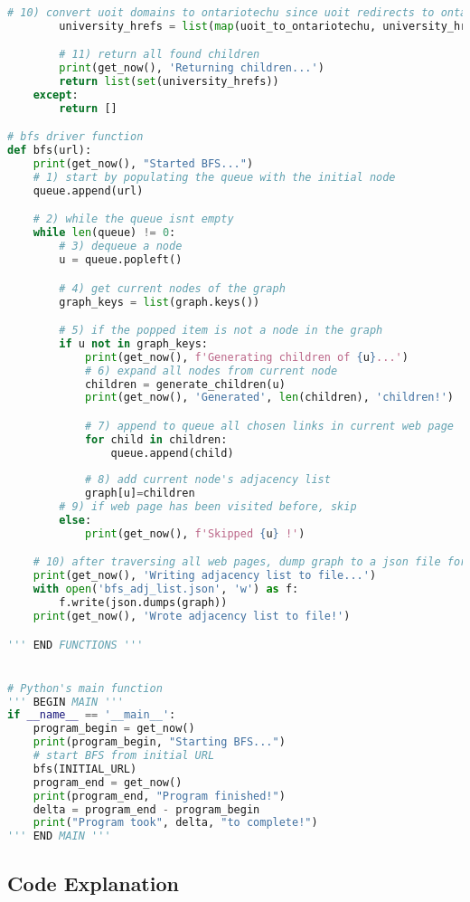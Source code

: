 \begin{lstlisting}[language=Python]
        # 10) convert uoit domains to ontariotechu since uoit redirects to ontariotech
        university_hrefs = list(map(uoit_to_ontariotechu, university_hrefs))

        # 11) return all found children
        print(get_now(), 'Returning children...')
        return list(set(university_hrefs))
    except:
        return []

# bfs driver function
def bfs(url):
    print(get_now(), "Started BFS...")
    # 1) start by populating the queue with the initial node
    queue.append(url)

    # 2) while the queue isnt empty
    while len(queue) != 0:
        # 3) dequeue a node
        u = queue.popleft()

        # 4) get current nodes of the graph
        graph_keys = list(graph.keys())

        # 5) if the popped item is not a node in the graph
        if u not in graph_keys:
            print(get_now(), f'Generating children of {u}...')
            # 6) expand all nodes from current node
            children = generate_children(u)
            print(get_now(), 'Generated', len(children), 'children!')

            # 7) append to queue all chosen links in current web page
            for child in children:
                queue.append(child)
            
            # 8) add current node's adjacency list
            graph[u]=children
        # 9) if web page has been visited before, skip
        else:
            print(get_now(), f'Skipped {u} !')

    # 10) after traversing all web pages, dump graph to a json file for posterior processing and analytics
    print(get_now(), 'Writing adjacency list to file...')
    with open('bfs_adj_list.json', 'w') as f:
        f.write(json.dumps(graph))
    print(get_now(), 'Wrote adjacency list to file!')

''' END FUNCTIONS '''


# Python's main function
''' BEGIN MAIN '''
if __name__ == '__main__':
    program_begin = get_now()
    print(program_begin, "Starting BFS...")
    # start BFS from initial URL
    bfs(INITIAL_URL)
    program_end = get_now()
    print(program_end, "Program finished!")
    delta = program_end - program_begin
    print("Program took", delta, "to complete!")
''' END MAIN '''
\end{lstlisting}

\subsection{Code Explanation}
